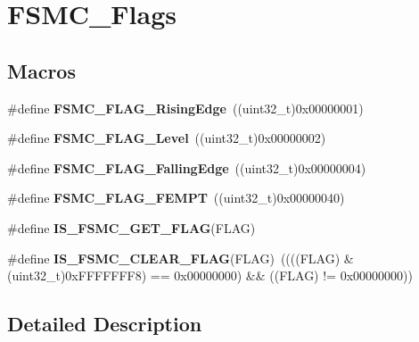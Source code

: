 \hypertarget{group___f_s_m_c___flags}{\section{F\-S\-M\-C\-\_\-\-Flags}
\label{group___f_s_m_c___flags}
}
\subsection*{Macros}
\begin{DoxyCompactItemize}
\item 
\hypertarget{group___f_s_m_c___flags_ga5aadbd5d9f1b6a25bcc1fc6f3bf4c9cc}{\#define {\bfseries F\-S\-M\-C\-\_\-\-F\-L\-A\-G\-\_\-\-Rising\-Edge}~((uint32\-\_\-t)0x00000001)}\label{group___f_s_m_c___flags_ga5aadbd5d9f1b6a25bcc1fc6f3bf4c9cc}

\item 
\hypertarget{group___f_s_m_c___flags_ga25868d35780998a52190c424ebb3823f}{\#define {\bfseries F\-S\-M\-C\-\_\-\-F\-L\-A\-G\-\_\-\-Level}~((uint32\-\_\-t)0x00000002)}\label{group___f_s_m_c___flags_ga25868d35780998a52190c424ebb3823f}

\item 
\hypertarget{group___f_s_m_c___flags_gaaaa85bce06ed962874686ad7af0f0cb7}{\#define {\bfseries F\-S\-M\-C\-\_\-\-F\-L\-A\-G\-\_\-\-Falling\-Edge}~((uint32\-\_\-t)0x00000004)}\label{group___f_s_m_c___flags_gaaaa85bce06ed962874686ad7af0f0cb7}

\item 
\hypertarget{group___f_s_m_c___flags_ga8da2bd0b9d11877aaebaba0c77e8b0cc}{\#define {\bfseries F\-S\-M\-C\-\_\-\-F\-L\-A\-G\-\_\-\-F\-E\-M\-P\-T}~((uint32\-\_\-t)0x00000040)}\label{group___f_s_m_c___flags_ga8da2bd0b9d11877aaebaba0c77e8b0cc}

\item 
\#define {\bfseries I\-S\-\_\-\-F\-S\-M\-C\-\_\-\-G\-E\-T\-\_\-\-F\-L\-A\-G}(F\-L\-A\-G)
\item 
\hypertarget{group___f_s_m_c___flags_ga1114bf56b54e726831b38fc8c5daa14e}{\#define {\bfseries I\-S\-\_\-\-F\-S\-M\-C\-\_\-\-C\-L\-E\-A\-R\-\_\-\-F\-L\-A\-G}(F\-L\-A\-G)~((((F\-L\-A\-G) \& (uint32\-\_\-t)0x\-F\-F\-F\-F\-F\-F\-F8) == 0x00000000) \&\& ((\-F\-L\-A\-G) != 0x00000000))}\label{group___f_s_m_c___flags_ga1114bf56b54e726831b38fc8c5daa14e}

\end{DoxyCompactItemize}


\subsection{Detailed Description}


